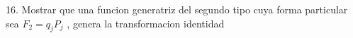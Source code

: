16. Mostrar que una funcion generatriz del segundo tipo cuya forma particular sea $F_2 = q_j P_j$ , genera la transformacion identidad